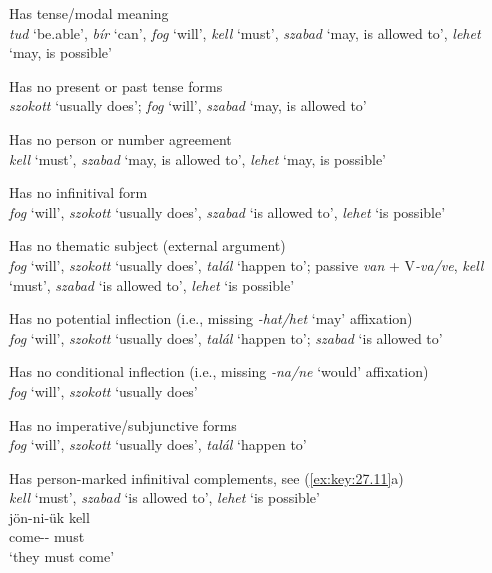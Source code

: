 \documentclass[output=paper]{langsci/langscibook}
\begin{document}
\ea\label{ex:key:27.3}
    Has tense/modal meaning\\
    \emph{tud} ‘be.able’, \emph{bír} ‘can’, \emph{fog} ‘will’, \emph{kell}
    ‘must’, \emph{szabad} ‘may, is allowed to’, \emph{lehet} ‘may, is possible’
\z

\ea\label{ex:key:27.4}
    Has no present or past tense forms\\
    \emph{szokott} ‘usually does’; \emph{fog} ‘will’, \emph{szabad} ‘may, is
    allowed to’
\z

\ea\label{ex:key:27.5}
    Has no person or number agreement\\
    \emph{kell} ‘must’, \emph{szabad} ‘may, is allowed to’, \emph{lehet} ‘may,
    is possible’
\z

\ea\label{ex:key:27.6}
    Has no infinitival form\\
    \emph{fog} ‘will’, \emph{szokott} ‘usually does’, \emph{szabad} ‘is allowed
    to’, \emph{lehet} ‘is possible’
\z

\ea\label{ex:key:27.7}
    Has no thematic subject (external argument)\\
    \emph{fog} ‘will’, \emph{szokott} ‘usually does’, \emph{talál} ‘happen to’;
    passive \emph{van} + V\emph{-va/ve}, \emph{kell} ‘must’,
    \emph{szabad} ‘is allowed to’, \emph{lehet} ‘is possible’
\z

\ea\label{ex:key:27.8}
    Has no potential inflection (i.e., missing \emph{-hat/het} ‘may’ affixation)\\
    \emph{fog} ‘will’, \emph{szokott} ‘usually does’, \emph{talál} ‘happen to’;
    \emph{szabad} ‘is allowed to’
\z

\ea\label{ex:key:27.9}
    Has no conditional inflection (i.e., missing \emph{-na/ne} ‘would’
    affixation)\\
    \emph{fog} ‘will’, \emph{szokott} ‘usually does’
\z

\ea\label{ex:key:27.10}
    Has no imperative/subjunctive forms\\
    \emph{fog} ‘will’, \emph{szokott} ‘usually does’, \emph{talál} ‘happen to’
\z

\ea\label{ex:key:27.11}
    Has person-marked infinitival complements, see (\ref{ex:key:27.11}a)\\
    \emph{kell} ‘must’, \emph{szabad} ‘is allowed to’, \emph{lehet} ‘is
    possible’
    \ea {}\\
        \gll jön-ni-ük kell\\
            come-\Inf{}-\Tpl{} must\\
        \glt ‘they must come’
    \z
\z
\end{document}
